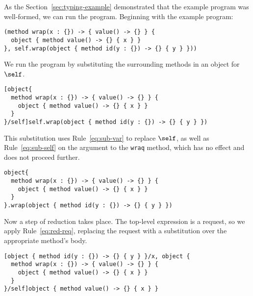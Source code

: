 \begin{scope}
  \def\ov{\overset{v}{\O}}
  \def\oid{\overset{id}{\O}}

  \def\x{\mlst{x}}
  \def\y{\mlst{y}}

  \def\vtype{\type{\head{value}{}{}}}
  \def\wrap{\method{\mlst{wrap}}{\x : \type{}}{\vtype}{\ov}}
  \def\mid{\method{\mlst{id}}{\y : \type{}}{\type{}}{\x}}
  \def\exp{\self.\mlst{wrap}\text{\po}\oid\text{\pc}}

  As the Section~\ref{sec:typing-example} demonstrated that the example program
  was well-formed, we can run the program. Beginning with the example program:

  \begin{lstlisting}
(method wrap(x : {}) -> { value() -> {} } {
  object { method value() -> {} { x } }
}, self.wrap(object { method id(y : {}) -> {} { y } }))
  \end{lstlisting}

  \noindent We run the program by substituting the surrounding methods in an
  object for $\self$.

  \begin{lstlisting}
[object{
  method wrap(x : {}) -> { value() -> {} } {
    object { method value() -> {} { x } }
  }
}/self]self.wrap(object { method id(y : {}) -> {} { y } })
  \end{lstlisting}

  \noindent This substitution uses Rule~\ref{eq:sub-var} to replace $\self$, as
  well as Rule~\ref{eq:sub-self} on the argument to the \lstinline{wraq} method,
  which has no effect and does not proceed further.

  \begin{lstlisting}
object{
  method wrap(x : {}) -> { value() -> {} } {
    object { method value() -> {} { x } }
  }
}.wrap(object { method id(y : {}) -> {} { y } })
  \end{lstlisting}

  \noindent Now a step of reduction takes place. The top-level expression is a
  request, so we apply Rule~\ref{eq:red-req}, replacing the request with a
  substitution over the appropriate method's body.

  \begin{lstlisting}
[object { method id(y : {}) -> {} { y } }/x, object {
  method wrap(x : {}) -> { value() -> {} } {
    object { method value() -> {} { x } }
  }
}/self]object { method value() -> {} { x } }
  \end{lstlisting}


\end{scope}
